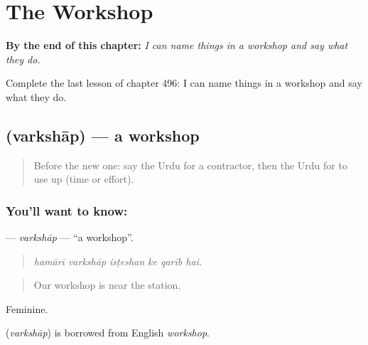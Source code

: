 
\chapter{The Workshop}
\label{ch:ur-the-workshop}

\begin{chapteropening}
\textbf{By the end of this chapter:} \emph{I can name things in a workshop and say what they do.}

Complete the last lesson of chapter 496: I can name things in a workshop and say what they do.
\end{chapteropening}

\section[\texorpdfstring{\ur{ورکشاپ} (varkshāp)}{ورکشاپ (varkshāp)}]{ (varkshāp) — a workshop}

\label{lesson:UR-C496-varkshap}



\begin{quote}
Before the new one: say the Urdu for a contractor, then the Urdu for to use up (time or effort).
\end{quote}

\subsection*{You'll want to know: }
\textbf{} — \emph{varkshāp} — \textquotedblleft{}a workshop\textquotedblright{}.

\begin{quote}
     
\end{quote}

\begin{quote}
\emph{hamārī varkshāp isṭeshan ke qarīb hai.}
\end{quote}

\begin{quote}
Our workshop is near the station.
\end{quote}

Feminine.

\begin{cousinweb}
\textbf{} (\emph{varkshāp}) is borrowed from English \emph{workshop}.
\end{cousinweb}

